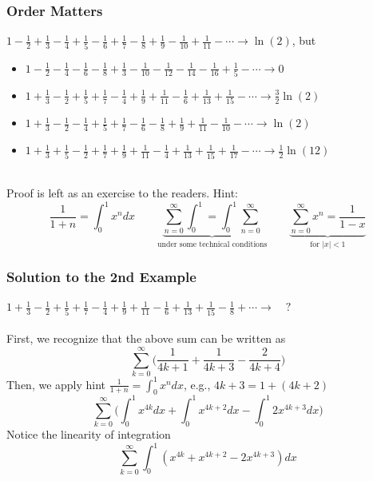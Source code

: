 \documentclass{beamer}
\begin{document}

\begin{frame}
\frametitle{Order Matters}

 $ 1 - \frac{1}{2} + \frac{1}{3} - \frac{1}{4} + \frac{1}{5} - \frac{1}{6} + \frac{1}{7} - \frac{1}{8} + \frac{1}{9} - \frac{1}{10} + \frac{1}{11} - \cdots \longrightarrow \ln (2) $, but
\begin{itemize}
    \item $ 1 - \frac{1}{2} - \frac{1}{4} - \frac{1}{6} - \frac{1}{8} + \frac{1}{3} - \frac{1}{10} - \frac{1}{12} - \frac{1}{14} - \frac{1}{16} + \frac{1}{5} - \cdots \longrightarrow 0 $
    \item $ 1 + \frac{1}{3} - \frac{1}{2} + \frac{1}{5} + \frac{1}{7} - \frac{1}{4} + \frac{1}{9} + \frac{1}{11} - \frac{1}{6} + \frac{1}{13} + \frac{1}{15} - \cdots \longrightarrow \frac{3}{2} \ln (2) $
    \item $ 1 + \frac{1}{3} - \frac{1}{2} - \frac{1}{4} + \frac{1}{5} + \frac{1}{7} - \frac{1}{6} - \frac{1}{8} + \frac{1}{9} + \frac{1}{11} - \frac{1}{10} - \cdots \longrightarrow \ln (2) $
    \item $ 1 + \frac{1}{3} + \frac{1}{5} - \frac{1}{2} + \frac{1}{7} + \frac{1}{9} + \frac{1}{11} - \frac{1}{4} + \frac{1}{13} + \frac{1}{15} + \frac{1}{17} - \cdots \longrightarrow \frac{1}{2} \ln (12) $
\end{itemize}

\ \\
Proof is left as an exercise to the readers. Hint: 
$$ \frac{1}{1 + n} = \int_0^1 x^n dx \qquad \underbrace{ \sum_{n=0}^{\infty} \int_0^1 = \int_0^1 \sum_{n=0}^{\infty} }_{\text{under some technical conditions}} \qquad \underbrace{ \sum_{n=0}^{\infty} x^n = \frac{1}{1-x} }_{\text{for } |x| < 1 } $$

\end{frame}


\begin{frame}
\frametitle{Solution to the 2nd Example}
$ 1 + \frac{1}{3} - \frac{1}{2} + \frac{1}{5} + \frac{1}{7} - \frac{1}{4} + \frac{1}{9} + \frac{1}{11} - \frac{1}{6} + \frac{1}{13} + \frac{1}{15} - \frac{1}{8} + \cdots \longrightarrow \quad ? $ \\
\ \\
First, we recognize that the above sum can be written as 
$$ \sum_{k=0}^{\infty} \big( \frac{1}{4k+1} + \frac{1}{4k+3} - \frac{2}{4k+4} \big) $$
Then, we apply hint $ \frac{1}{1 + n} = \int_0^1 x^n dx $, e.g., $ 4k + 3 = 1 + (4k + 2)$
$$ \sum_{k=0}^{\infty} \big( \int_0^1 x^{4k} dx + \int_0^1 x^{4k+2} dx - \int_0^1 2x^{4k+3} dx \big) $$
Notice the linearity of integration  
$$ \sum_{k=0}^{\infty} \int_0^1 (x^{4k} + x^{4k+2} - 2x^{4k+3}) dx $$
\end{frame}
\end{document}
